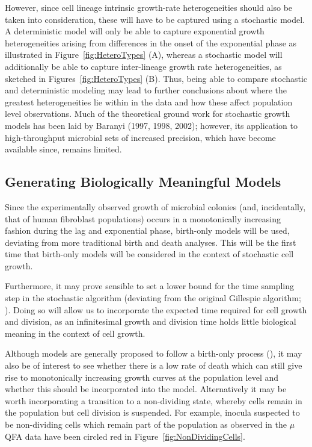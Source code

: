 \documentclass{bioinfo}
\begin{document}
However, since cell lineage intrinsic growth-rate heterogeneities should also be taken into consideration, these will have to be captured using a stochastic model. A deterministic model will only be able to capture exponential growth heterogeneities arising from differences in the onset of the exponential phase as illustrated in Figure~\ref{fig:HeteroTypes} (A), whereas a stochastic model will additionally be able to capture inter-lineage growth rate heterogeneities, as sketched in Figures~\ref{fig:HeteroTypes}  (B). Thus, being able to compare stochastic and deterministic modeling may lead to further conclusions about where the greatest heterogeneities lie within in the data and how these affect population level observations. Much of the theoretical ground work for stochastic growth models has been laid by Baranyi (1997, 1998, 2002); however, its application to high-throughput microbial sets of increased precision, which have become available since, remains limited. 

\subsection{Generating Biologically Meaningful Models}

Since the experimentally observed growth of microbial colonies (and, incidentally, that of human fibroblast populations) occurs in a monotonically increasing fashion during the lag and exponential phase, birth-only models will be used, deviating from more traditional birth and death analyses. This will be the first time that birth-only models will be considered in the context of stochastic cell growth. 

Furthermore, it may prove sensible to set a lower bound for the time sampling step in the stochastic algorithm (deviating from the original Gillespie algorithm; \citealp{Gillespie77}). Doing so will allow us to incorporate the expected time required for cell growth and division, as an infinitesimal  growth and division time holds little biological meaning in the context of cell growth. 

Although models are generally proposed to follow a birth-only process (\citealp{Bailey64}), it may also be of interest to see whether there is a low rate of death which can still give rise to monotonically increasing growth curves at the population level and whether this should be incorporated into the model. Alternatively it may be worth incorporating a transition to a non-dividing state, whereby cells remain in the population but cell division is suspended. For example, inocula suspected to be non-dividing cells which remain part of the population as observed in the $\mu$QFA data have been circled  red in Figure~\ref{fig:NonDividingCells}. 
\end{document}
